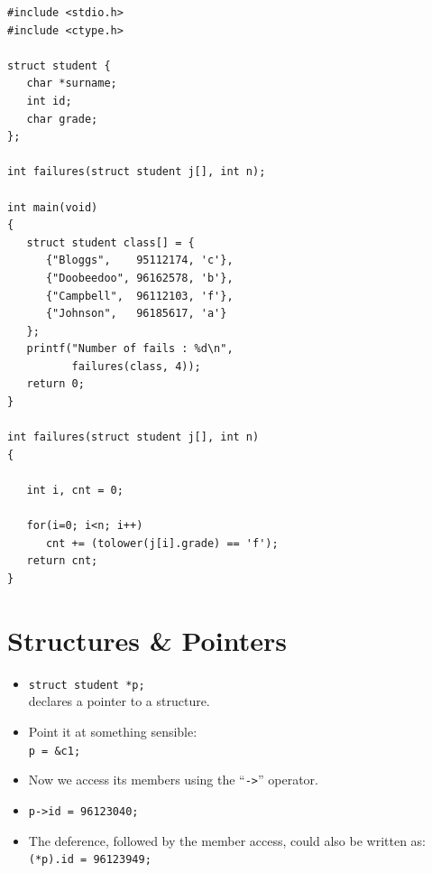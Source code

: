 \documentclass[a4,portraitt]{slides}
\begin{document}
\newpage
{\samepage
{\small
\begin{verbatim}
#include <stdio.h>
#include <ctype.h>

struct student {
   char *surname;
   int id;
   char grade;
};

int failures(struct student j[], int n);

int main(void)
{
   struct student class[] = {
      {"Bloggs",    95112174, 'c'},
      {"Doobeedoo", 96162578, 'b'},
      {"Campbell",  96112103, 'f'},
      {"Johnson",   96185617, 'a'}
   };
   printf("Number of fails : %d\n",
          failures(class, 4));
   return 0;
}

int failures(struct student j[], int n)
{

   int i, cnt = 0;

   for(i=0; i<n; i++)
      cnt += (tolower(j[i].grade) == 'f');
   return cnt;
}
\end{verbatim}
}}
\newpage
\section*{Structures \& Pointers}
\begin{itemize}
\item \verb^struct student *p;^\\
declares a pointer to a structure.
\item Point it at something sensible:\\
\verb^p = &c1;^
\item Now we access its members using the ``\verb^->^''
operator.
\item \verb^p->id = 96123040;^
\item The deference, followed by the member access, could also be written as: \verb^(*p).id = 96123949;^
\end{itemize}
\end{document}

